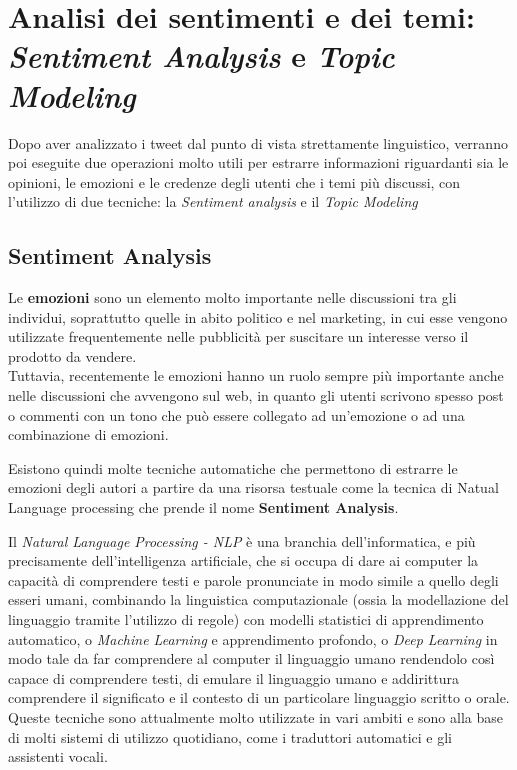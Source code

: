 \section{Analisi dei sentimenti e dei temi:  \textit{Sentiment Analysis} e \textit{Topic Modeling} }
Dopo aver analizzato i tweet dal punto di vista strettamente linguistico, verranno poi eseguite due operazioni molto utili per estrarre informazioni riguardanti sia le opinioni, le emozioni e le credenze degli utenti che i temi più discussi, con l'utilizzo di due tecniche: la \textit{Sentiment analysis} e il \textit{Topic Modeling}

\subsection{Sentiment Analysis} \label{sec: sent_an}
Le \textbf{emozioni} sono un elemento molto importante nelle discussioni tra gli individui, soprattutto quelle in abito politico e nel marketing, in cui esse vengono utilizzate frequentemente nelle pubblicità per suscitare un interesse verso il prodotto da vendere. \\
Tuttavia, recentemente le emozioni hanno un ruolo sempre più importante anche nelle discussioni che avvengono sul web, in quanto gli utenti scrivono spesso post o commenti con un tono che può essere collegato ad un'emozione o ad una combinazione di emozioni.

Esistono quindi molte tecniche automatiche che permettono di estrarre le emozioni degli autori a partire da una risorsa testuale come la tecnica di Natual Language processing che prende il nome \textbf{Sentiment Analysis}.

Il \textit{Natural Language Processing - NLP} è una branchia dell'informatica, e più precisamente dell'intelligenza artificiale, che si occupa di dare ai computer la capacità di comprendere testi e parole pronunciate in modo simile a quello degli esseri umani, combinando la linguistica computazionale (ossia la modellazione del linguaggio tramite l'utilizzo di regole) con modelli statistici di apprendimento automatico, o \textit{Machine Learning} e apprendimento profondo, o \textit{Deep Learning} in modo tale da far comprendere al computer il linguaggio umano rendendolo così capace di comprendere testi, di emulare il linguaggio umano e addirittura comprendere il significato e il contesto di un particolare linguaggio scritto o orale.
Queste tecniche sono attualmente molto utilizzate in vari ambiti e sono alla base di molti sistemi di utilizzo quotidiano, come i traduttori automatici e gli assistenti vocali. 

